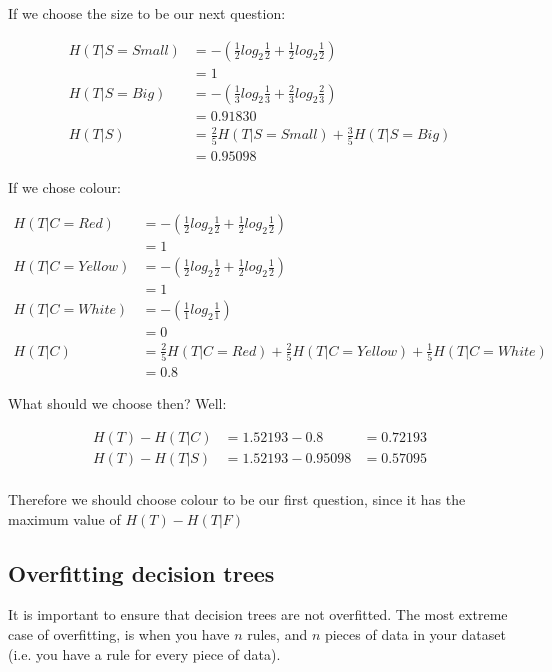 If we choose the size to be our next question:

\begin{align*}
  H(T | S = Small) &= -\left(\frac{1}{2}log_2\frac{1}{2} + \frac{1}{2}log_2\frac{1}{2}\right)\\
                   &= 1\\
  H(T | S = Big)   &= -\left(\frac{1}{3}log_2\frac{1}{3} + \frac{2}{3}log_2\frac{2}{3}\right)\\
                   &= 0.91830\\
  H(T | S)         &= \frac{2}{5}H(T | S = Small) + \frac{3}{5}H(T | S = Big)\\
                   &= 0.95098
\end{align*}

If we chose colour:

\begin{align*}
  H(T | C = Red)   &= -\left(\frac{1}{2}log_2\frac{1}{2} + \frac{1}{2}log_2\frac{1}{2}\right)\\
                   &= 1\\
  H(T | C = Yellow)&= -\left(\frac{1}{2}log_2\frac{1}{2} + \frac{1}{2}log_2\frac{1}{2}\right)\\
                   &= 1\\
  H(T | C = White) &= -\left(\frac{1}{1}log_2\frac{1}{1}\right)\\
                   &= 0\\
  H(T | C)         &= \frac{2}{5}H(T | C = Red) + \frac{2}{5}H(T | C = Yellow) + \frac{1}{5}H(T | C = White)\\
                   &= 0.8
\end{align*}

What should we choose then? Well:

\begin{align*}
  H(T) - H(T | C) &= 1.52193 - 0.8 &= 0.72193\\
  H(T) - H(T | S) &= 1.52193 - 0.95098 &= 0.57095\\
\end{align*}

Therefore we should choose colour to be our first question, since it has the
maximum value of $H(T) - H(T|F)$

\subsection{Overfitting decision trees}

It is important to ensure that decision trees are not overfitted. The most
extreme case of overfitting, is when you have $n$ rules, and $n$ pieces of data
in your dataset (i.e. you have a rule for every piece of data).

